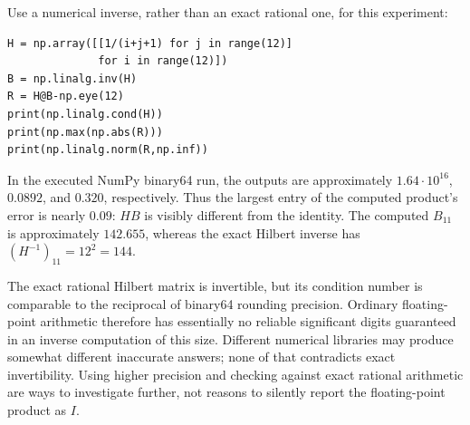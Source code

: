 Use a numerical inverse, rather than an exact rational one, for this experiment:
\begin{verbatim}
H = np.array([[1/(i+j+1) for j in range(12)]
              for i in range(12)])
B = np.linalg.inv(H)
R = H@B-np.eye(12)
print(np.linalg.cond(H))
print(np.max(np.abs(R)))
print(np.linalg.norm(R,np.inf))
\end{verbatim}
In the executed NumPy binary64 run, the outputs are approximately
$1.64\cdot10^{16}$, $0.0892$, and $0.320$, respectively.
Thus the largest entry of the computed product's error is nearly $0.09$:
$HB$ is visibly different from the identity. The computed $B_{11}$ is
approximately $142.655$, whereas the exact Hilbert inverse has
$(H^{-1})_{11}=12^2=144$.

The exact rational Hilbert matrix is invertible, but its condition number
is comparable to the reciprocal of binary64 rounding precision. Ordinary
floating-point arithmetic therefore has essentially no reliable significant
digits guaranteed in an inverse computation of this size. Different
numerical libraries may produce somewhat different inaccurate answers;
none of that contradicts exact invertibility. Using higher precision and
checking against exact rational arithmetic are ways to investigate further,
not reasons to silently report the floating-point product as $I$.
